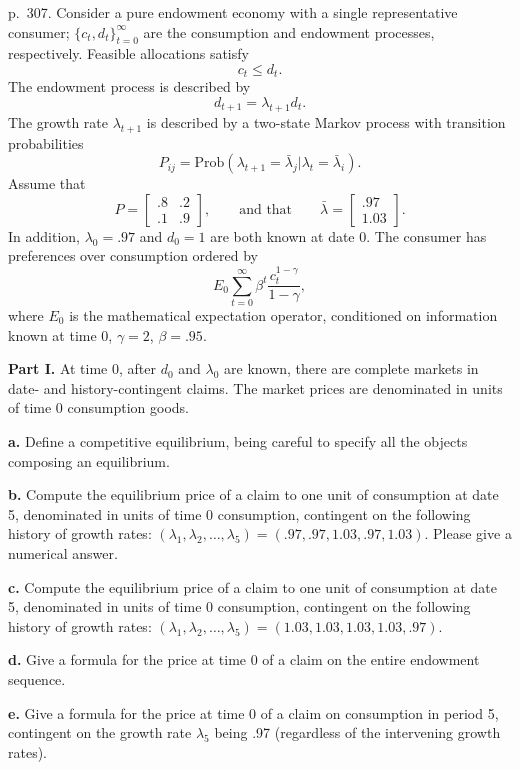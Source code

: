 \documentclass[12pt, letterpaper]{article}
\begin{document}
\begin{tcolorbox}[evenbox,title={Exercise 8.6 \quad Mehra--Prescott endowment, two market structures}]
\begin{tcolorbox}[questionbox]
p.~307. Consider a pure endowment economy with a single representative consumer; $\{c_t,d_t\}_{t=0}^\infty$ are
the consumption and endowment processes, respectively. Feasible allocations satisfy
\[
c_t\le d_t.
\]
The endowment process is described by
\[
d_{t+1}=\lambda_{t+1}d_t.
\]
The growth rate $\lambda_{t+1}$ is described by a two-state Markov process with transition probabilities
\[
P_{ij}=\mathrm{Prob}(\lambda_{t+1}=\bar\lambda_j|\lambda_t=\bar\lambda_i).
\]
Assume that
\[
P=\begin{bmatrix}.8&.2\\.1&.9\end{bmatrix},\qquad\text{and that}\qquad\bar\lambda=\begin{bmatrix}.97\\1.03\end{bmatrix}.
\]
In addition, $\lambda_0=.97$ and $d_0=1$ are both known at date 0. The consumer has preferences over
consumption ordered by
\[
E_0\sum_{t=0}^\infty\beta^t\frac{c_t^{1-\gamma}}{1-\gamma},
\]
where $E_0$ is the mathematical expectation operator, conditioned on information known at time 0,
$\gamma=2$, $\beta=.95$.

\textbf{Part I.} At time 0, after $d_0$ and $\lambda_0$ are known, there are complete markets in date- and
history-contingent claims. The market prices are denominated in units of time 0 consumption goods.

\textbf{a.} Define a competitive equilibrium, being careful to specify all the objects composing an
equilibrium.

\textbf{b.} Compute the equilibrium price of a claim to one unit of consumption at date 5, denominated in
units of time 0 consumption, contingent on the following history of growth rates:
$(\lambda_1,\lambda_2,\dots,\lambda_5)=(.97,.97,1.03,.97,1.03)$. Please give a numerical answer.

\textbf{c.} Compute the equilibrium price of a claim to one unit of consumption at date 5, denominated in
units of time 0 consumption, contingent on the following history of growth rates:
$(\lambda_1,\lambda_2,\dots,\lambda_5)=(1.03,1.03,1.03,1.03,.97)$.

\textbf{d.} Give a formula for the price at time 0 of a claim on the entire endowment sequence.

\textbf{e.} Give a formula for the price at time 0 of a claim on consumption in period 5, contingent on the
growth rate $\lambda_5$ being .97 (regardless of the intervening growth rates).


\end{tcolorbox}
\end{tcolorbox}
\end{document}
